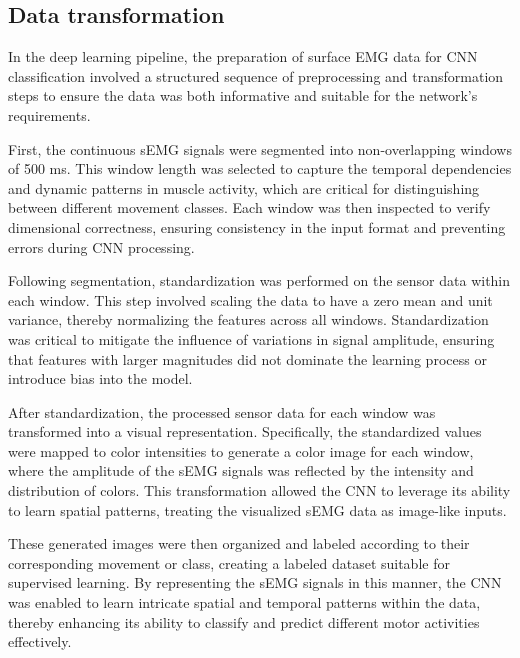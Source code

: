 \documentclass[preprint,12pt]{elsarticle}
\begin{document}
\subsection{Data transformation}

In the deep learning pipeline, the preparation of surface EMG data for CNN classification involved a structured sequence of preprocessing and transformation steps to ensure the data was both informative and suitable for the network's requirements.

First, the continuous sEMG signals were segmented into non-overlapping windows of 500 ms. This window length was selected to capture the temporal dependencies and dynamic patterns in muscle activity, which are critical for distinguishing between different movement classes. Each window was then inspected to verify dimensional correctness, ensuring consistency in the input format and preventing errors during CNN processing.

Following segmentation, standardization was performed on the sensor data within each window. This step involved scaling the data to have a zero mean and unit variance, thereby normalizing the features across all windows. Standardization was critical to mitigate the influence of variations in signal amplitude, ensuring that features with larger magnitudes did not dominate the learning process or introduce bias into the model.

After standardization, the processed sensor data for each window was transformed into a visual representation. Specifically, the standardized values were mapped to color intensities to generate a color image for each window, where the amplitude of the sEMG signals was reflected by the intensity and distribution of colors. This transformation allowed the CNN to leverage its ability to learn spatial patterns, treating the visualized sEMG data as image-like inputs.

These generated images were then organized and labeled according to their corresponding movement or class, creating a labeled dataset suitable for supervised learning. By representing the sEMG signals in this manner, the CNN was enabled to learn intricate spatial and temporal patterns within the data, thereby enhancing its ability to classify and predict different motor activities effectively.
\end{document}
